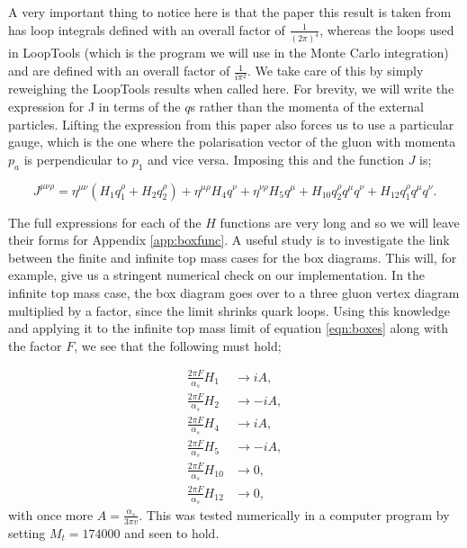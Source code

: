 A very important thing to notice here is that the paper this result is taken from has loop integrals defined with an overall factor of $\frac{1}{(2 \pi)^4}$, whereas the loops used in LoopTools \cite{Hahn1999} (which is the program we will use in the Monte Carlo integration) and \cite{DelDuca2001} are defined with an overall factor of $\frac{1}{i \pi^2}$. We take care of this by simply reweighing the LoopTools results when called here. For brevity, we will write the expression for J in terms of the $q$s rather than the momenta of the external particles. Lifting the expression from this paper also forces us to use a particular gauge, which is the one where the polarisation vector of the gluon with momenta $p_a$ is perpendicular to $p_1$ and vice versa. Imposing this and the function $J$ is;%

\begin{equation}
J^{\mu \nu \rho} = \eta^{\mu \nu}(H_1 q_1^\rho + H_2 q_2^\rho) + \eta^{\mu \rho}H_4 q^\nu + \eta^{\nu \rho}H_5 q^\mu + H_{10} q_2^\rho q^\mu q^\nu + H_{12} q_1^\rho q^\mu q^\nu.
\label{eqn:boxes}
\end{equation}

The full expressions for each of the $H$ functions are very long and so we will leave their forms for Appendix \ref{app:boxfunc}. A useful study is to investigate the link between the finite and infinite top mass cases for the box diagrams. This will, for example, give us a stringent numerical check on our implementation. In the infinite top mass case, the box diagram goes over to a three gluon vertex diagram multiplied by a factor, since the limit shrinks quark loops. Using this knowledge and applying it to the infinite top mass limit of equation \ref{eqn:boxes} along with the factor $F$, we see that the following must hold; 

\begin{equation}
\begin{split}
\frac{2 \pi F}{\alpha_s} H_1 & \to i A, \\
\frac{2 \pi F}{\alpha_s} H_2  &\to -i A, \\
\frac{2 \pi F}{\alpha_s} H_4  &\to i A, \\
\frac{2 \pi F}{\alpha_s} H_5  &\to -i A, \\
\frac{2 \pi F}{\alpha_s} H_{10} &\to 0, \\
\frac{2 \pi F}{\alpha_s} H_{12} &\to 0,
\end{split}
\end{equation}
with once more $A = \frac{\alpha_s}{3 \pi v}$. This was tested numerically in a computer program by setting $M_t = 174000$ and seen to hold. %

